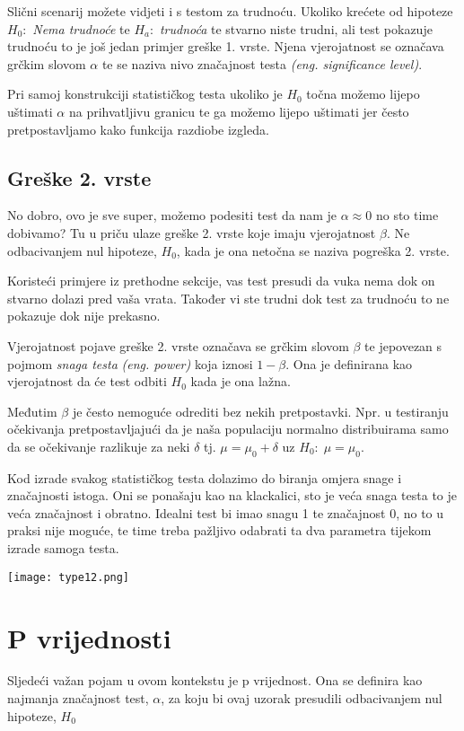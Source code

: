 Slični scenarij možete vidjeti i s testom za trudnoću. Ukoliko krećete od hipoteze  $H_0:$ \emph{Nema trudnoće} te $H_a:$ \emph{trudnoća} te stvarno niste trudni, ali test pokazuje trudnoću to je još jedan primjer greške 1. vrste. Njena vjerojatnost se označava grčkim slovom $\alpha$ te se naziva nivo značajnost testa \textit{(eng. significance level)}.

Pri samoj konstrukciji statističkog testa ukoliko je $H_0$ točna možemo lijepo uštimati $\alpha$ na prihvatljivu granicu te ga možemo lijepo uštimati jer često pretpostavljamo kako funkcija razdiobe izgleda. 

\subsection{Greške 2. vrste}

No dobro, ovo je sve super, možemo podesiti test da nam je $\alpha \approx 0$ no sto time dobivamo? Tu u priču ulaze greške 2. vrste koje imaju vjerojatnost $\beta$. Ne odbacivanjem nul hipoteze, $H_0$, kada je ona netočna se naziva pogreška 2. vrste. \cite{engstat}

Koristeći primjere iz prethodne sekcije, vas test presudi da vuka nema dok on stvarno dolazi pred vaša vrata. Također vi ste trudni dok test za trudnoću to ne pokazuje dok nije prekasno. 

Vjerojatnost pojave greške 2. vrste označava se grčkim slovom $\beta$ te jepovezan s pojmom \emph{snaga testa} \textit{(eng. power)} koja iznosi $1-\beta$. Ona je definirana kao vjerojatnost da će test odbiti $H_0$ kada je ona lažna. 

Međutim $\beta$ je često nemoguće odrediti bez nekih pretpostavki. Npr. u testiranju očekivanja pretpostavljajući da je naša populaciju normalno distribuirama samo da se očekivanje razlikuje za neki $\delta$ tj. $\mu = \mu_0 + \delta$ uz $H_0: \; \mu = \mu_0$.

Kod izrade svakog statističkog testa dolazimo do biranja omjera snage i značajnosti istoga. Oni se ponašaju kao na klackalici, sto je veća snaga testa to je veća značajnost i obratno. Idealni test bi imao snagu 1 te značajnost 0, no to u praksi nije moguće, te time treba pažljivo odabrati ta dva parametra tijekom izrade samoga testa.

\texttt{[image: type12.png]}

\section{P vrijednosti}
Sljedeći važan pojam u ovom kontekstu je p vrijednost. Ona se definira kao najmanja značajnost test, $\alpha$, za koju bi ovaj uzorak presudili odbacivanjem nul hipoteze, $H_0$ \cite{engstat}

